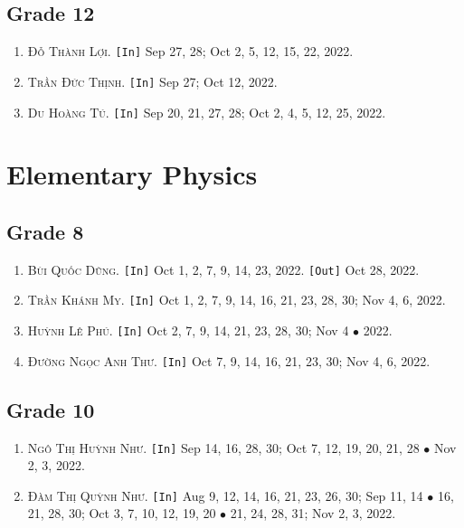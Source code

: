 \documentclass{article}
\numberwithin{equation}{section}
\begin{document}
\subsection{Grade 12}
\begin{enumerate}
	\item \textsc{Đỗ Thành Lợi.} \texttt{[In]} Sep 27, 28; Oct 2, 5, 12, 15, 22, 2022.
	\item \textsc{Trần Đức Thịnh.} \texttt{[In]} Sep 27; Oct 12, 2022.
	\item \textsc{Du Hoàng Tú.} \texttt{[In]} Sep 20, 21, 27, 28; Oct 2, 4, 5, 12, 25, 2022.
\end{enumerate}


\section{Elementary Physics}

\subsection{Grade 8}
\begin{enumerate}
	\item \textsc{Bùi Quốc Dũng.} \texttt{[In]} Oct 1, 2, 7, 9, 14, 23, 2022. \texttt{[Out]} Oct 28, 2022.
	\item \textsc{Trần Khánh My.} \texttt{[In]} Oct 1, 2, 7, 9, 14, 16, 21, 23, 28, 30; Nov 4, 6, 2022.
	\item \textsc{Huỳnh Lê Phú.} \texttt{[In]} Oct 2, 7, 9, 14, 21, 23, 28, 30; Nov 4 $\bullet$ 2022.
	\item \textsc{Đường Ngọc Anh Thư.} \texttt{[In]} Oct 7, 9, 14, 16, 21, 23, 30; Nov 4, 6, 2022.
\end{enumerate}

\subsection{Grade 10}
\begin{enumerate}
	\item \textsc{Ngô Thị Huỳnh Như.} \texttt{[In]} Sep 14, 16, 28, 30; Oct 7, 12, 19, 20, 21, 28 $\bullet$ Nov 2, 3, 2022.
	\item \textsc{Đàm Thị Quỳnh Như.} \texttt{[In]} Aug 9, 12, 14, 16, 21, 23, 26, 30; Sep 11, 14 $\bullet$ 16, 21, 28, 30; Oct 3, 7, 10, 12, 19, 20 $\bullet$ 21, 24, 28, 31; Nov 2, 3, 2022.
\end{enumerate}
\end{document}
